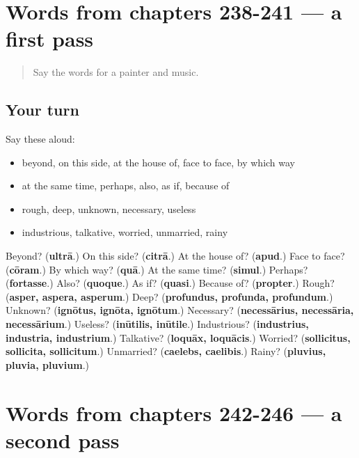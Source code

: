 \section[(dialogue)]{Words from chapters 238-241 — a first pass}

\label{lesson:LA-R246-first-pass-words-from-chapters-238-241}



\begin{quote}
Say the words for a painter and music.
\end{quote}

\subsection*{Your turn}
Say these aloud:

\begin{itemize}
\raggedright
  \item beyond, on this side, at the house of, face to face, by which way
  \item at the same time, perhaps, also, as if, because of
  \item rough, deep, unknown, necessary, useless
  \item industrious, talkative, worried, unmarried, rainy
\end{itemize}

\begin{tcolorbox}[breakable,colback=teal!4,colframe=teal!35!black,title={Before you move on}]
Beyond? (\textbf{ultrā}.) On this side? (\textbf{citrā}.) At the house of? (\textbf{apud}.) Face to face? (\textbf{cōram}.) By which way? (\textbf{quā}.) At the same time? (\textbf{simul}.) Perhaps? (\textbf{fortasse}.) Also? (\textbf{quoque}.) As if? (\textbf{quasi}.) Because of? (\textbf{propter}.) Rough? (\textbf{asper, aspera, asperum}.) Deep? (\textbf{profundus, profunda, profundum}.) Unknown? (\textbf{ignōtus, ignōta, ignōtum}.) Necessary? (\textbf{necessārius, necessāria, necessārium}.) Useless? (\textbf{inūtilis, inūtile}.) Industrious? (\textbf{industrius, industria, industrium}.) Talkative? (\textbf{loquāx, loquācis}.) Worried? (\textbf{sollicitus, sollicita, sollicitum}.) Unmarried? (\textbf{caelebs, caelibis}.) Rainy? (\textbf{pluvius, pluvia, pluvium}.)
\end{tcolorbox}
\section[(dialogue)]{Words from chapters 242-246 — a second pass}

